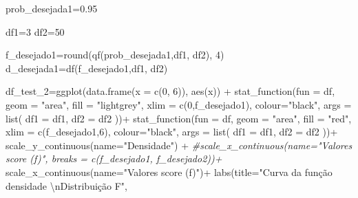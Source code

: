 \documentclass[
]{book}
\newenvironment{Shaded}{\begin{snugshade}}{\end{snugshade}}
\newcommand{\AttributeTok}[1]{\textcolor[rgb]{0.77,0.63,0.00}{#1}}
\newcommand{\CommentTok}[1]{\textcolor[rgb]{0.56,0.35,0.01}{\textit{#1}}}
\newcommand{\DecValTok}[1]{\textcolor[rgb]{0.00,0.00,0.81}{#1}}
\newcommand{\FloatTok}[1]{\textcolor[rgb]{0.00,0.00,0.81}{#1}}
\newcommand{\FunctionTok}[1]{\textcolor[rgb]{0.00,0.00,0.00}{#1}}
\newcommand{\NormalTok}[1]{#1}
\newcommand{\OtherTok}[1]{\textcolor[rgb]{0.56,0.35,0.01}{#1}}
\newcommand{\SpecialCharTok}[1]{\textcolor[rgb]{0.00,0.00,0.00}{#1}}
\newcommand{\StringTok}[1]{\textcolor[rgb]{0.31,0.60,0.02}{#1}}
\begin{document}
\begin{Shaded}
\begin{Highlighting}[]
\NormalTok{prob\_desejada1}\OtherTok{=}\FloatTok{0.95}

\NormalTok{df1}\OtherTok{=}\DecValTok{3}
\NormalTok{df2}\OtherTok{=}\DecValTok{50}  

\NormalTok{f\_desejado1}\OtherTok{=}\FunctionTok{round}\NormalTok{(}\FunctionTok{qf}\NormalTok{(prob\_desejada1,df1, df2), }\DecValTok{4}\NormalTok{)}
\NormalTok{d\_desejada1}\OtherTok{=}\FunctionTok{df}\NormalTok{(f\_desejado1,df1, df2)}



\NormalTok{df\_test\_2}\OtherTok{=}\FunctionTok{ggplot}\NormalTok{(}\FunctionTok{data.frame}\NormalTok{(}\AttributeTok{x =} \FunctionTok{c}\NormalTok{(}\DecValTok{0}\NormalTok{, }\DecValTok{6}\NormalTok{)), }\FunctionTok{aes}\NormalTok{(x)) }\SpecialCharTok{+}
  \FunctionTok{stat\_function}\NormalTok{(}\AttributeTok{fun =}\NormalTok{ df,}
                \AttributeTok{geom =} \StringTok{"area"}\NormalTok{,}
                \AttributeTok{fill =} \StringTok{"lightgrey"}\NormalTok{,}
                \AttributeTok{xlim =} \FunctionTok{c}\NormalTok{(}\DecValTok{0}\NormalTok{,f\_desejado1),}
                \AttributeTok{colour=}\StringTok{"black"}\NormalTok{,}
                \AttributeTok{args =} \FunctionTok{list}\NormalTok{(}
                  \AttributeTok{df1 =}\NormalTok{ df1,}
                  \AttributeTok{df2 =}\NormalTok{ df2}
\NormalTok{                ))}\SpecialCharTok{+}
  \FunctionTok{stat\_function}\NormalTok{(}\AttributeTok{fun =}\NormalTok{ df,}
                \AttributeTok{geom =} \StringTok{"area"}\NormalTok{,}
                \AttributeTok{fill =} \StringTok{"red"}\NormalTok{,}
                \AttributeTok{xlim =} \FunctionTok{c}\NormalTok{(f\_desejado1,}\DecValTok{6}\NormalTok{),}
                \AttributeTok{colour=}\StringTok{"black"}\NormalTok{,}
                \AttributeTok{args =} \FunctionTok{list}\NormalTok{(}
                  \AttributeTok{df1 =}\NormalTok{ df1,}
                  \AttributeTok{df2 =}\NormalTok{ df2}
\NormalTok{                ))}\SpecialCharTok{+}
  \FunctionTok{scale\_y\_continuous}\NormalTok{(}\AttributeTok{name=}\StringTok{"Densidade"}\NormalTok{) }\SpecialCharTok{+}
  \CommentTok{\#scale\_x\_continuous(name="Valores score (f)", breaks = c(f\_desejado1, f\_desejado2))+  }
  \FunctionTok{scale\_x\_continuous}\NormalTok{(}\AttributeTok{name=}\StringTok{"Valores score (f)"}\NormalTok{)}\SpecialCharTok{+}  
  \FunctionTok{labs}\NormalTok{(}\AttributeTok{title=}\StringTok{"Curva da função densidade }\SpecialCharTok{\textbackslash{}n}\StringTok{Distribuição F"}\NormalTok{, }

\end{Highlighting}
\end{Shaded}
\end{document}

